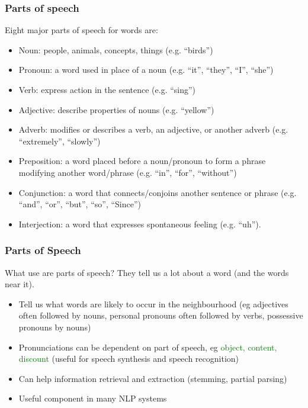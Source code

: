 \begin{frame}[fragile]\frametitle{Parts of speech}
  Eight major parts of speech for words are: 
  \begin{itemize}

  \item Noun: people, animals, concepts, things (e.g. ``birds'')
  \item Pronoun: a word used in place of a noun (e.g. ``it'', ``they'', ``I'', ``she'')
  \item Verb: express action in the sentence (e.g. ``sing'')
  \item Adjective: describe properties of nouns (e.g. ``yellow'')
  \item Adverb: modifies or describes a verb, an adjective, or another adverb (e.g. ``extremely'', ``slowly'')
  \item Preposition: a word placed before a noun/pronoun to form a phrase modifying another word/phrase (e.g. ``in'', ``for'', ``without'')
  \item Conjunction: a word that connects/conjoins another sentence or phrase (e.g. ``and'', ``or'', ``but'', ``so'', ``Since'') 
  \item Interjection: a word that expresses spontaneous feeling (e.g. ``uh'').

 
  \end{itemize}
\end{frame}


\begin{frame}[fragile]\frametitle{Parts of Speech}

  \begin{alertblock}{What use are parts of speech?}
    They tell us a lot about a word (and the words near it).
  \end{alertblock}

  
  \begin{itemize}
  \item Tell us what words are likely to occur in the neighbourhood
    (eg adjectives often followed by nouns, personal pronouns often
    followed by verbs, possessive pronouns by nouns)
  \item Pronunciations can be dependent on part of speech, eg
    \textcolor{green}{object, content, discount} (useful for speech
    synthesis and speech recognition)
  \item Can help information retrieval and extraction (stemming,
    partial parsing) 
  \item Useful component in many NLP systems
  \end{itemize}
  
\end{frame}

